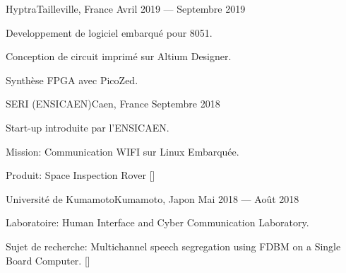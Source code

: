 \documentclass{faresume}
\begin{document}
\begin{column}[\leftcolumnwidth]




            {Hyptra}{Tailleville, France}
            {Avril 2019 --- Septembre 2019}
            {%
                \begin{additems}
                    \item Developpement de logiciel embarqué pour 8051.
                    \item Conception de circuit imprimé sur Altium Designer.
                    \item Synthèse FPGA avec PicoZed.
                \end{additems}
            }

            {SERI (ENSICAEN)}{Caen, France}
            {Septembre 2018}
            {%
                \begin{additems}
                    \item Start-up introduite par l'ENSICAEN.
                    \item Mission: Communication WIFI sur Linux Embarquée.
                    \item Produit: Space Inspection Rover []
                \end{additems}
            }

            {Université de Kumamoto}{Kumamoto, Japon}
            {Mai 2018 --- Ao\^ut 2018}
            {%
                \begin{additems}
                    \item Laboratoire: Human Interface and Cyber Communication Laboratory.
                    \item Sujet de recherche: Multichannel speech segregation using FDBM on a Single Board Computer. []
                \end{additems}
            }


\end{column}
\end{document}
